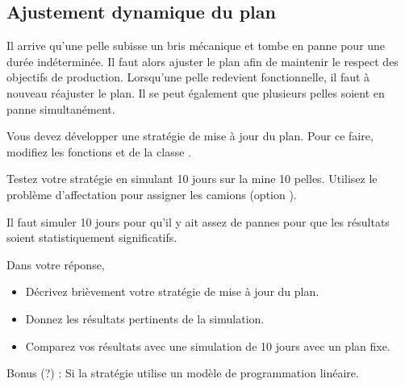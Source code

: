 \subsection{Ajustement dynamique du plan}

Il arrive qu'une pelle subisse un bris mécanique et tombe en panne pour une durée indéterminée. Il faut alors ajuster le plan afin de maintenir le respect des objectifs de production. Lorsqu'une pelle redevient fonctionnelle, il faut à nouveau réajuster le plan. Il se peut également que plusieurs pelles soient en panne simultanément.

Vous devez développer une stratégie de mise à jour du plan. Pour ce faire, modifiez les fonctions et de la classe .

Testez votre stratégie en simulant 10 jours sur la mine 10 pelles. Utilisez le problème d'affectation pour assigner les camions (option ).

Il faut simuler 10 jours pour qu'il y ait assez de pannes pour que les résultats soient statistiquement significatifs.

Dans votre réponse, 

\begin{itemize}
	\item Décrivez brièvement votre stratégie de mise à jour du plan.
	\item Donnez les résultats pertinents de la simulation.
	\item Comparez vos résultats avec une simulation de 10 jours avec un plan fixe. 
\end{itemize}
Bonus (?) : Si la stratégie utilise un modèle de programmation linéaire.
